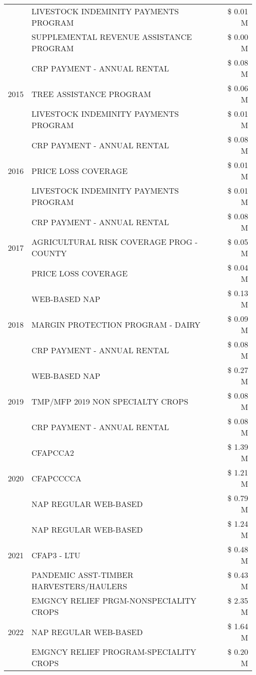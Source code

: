 \begin{tabular}{llr}
 & LIVESTOCK INDEMINITY PAYMENTS PROGRAM & \$ 0.01 M \\
 & SUPPLEMENTAL REVENUE ASSISTANCE PROGRAM & \$ 0.00 M \\
\cline{1-3}
\multirow[t]{3}{*}{2015} & CRP PAYMENT - ANNUAL RENTAL & \$ 0.08 M \\
 & TREE ASSISTANCE PROGRAM & \$ 0.06 M \\
 & LIVESTOCK INDEMINITY PAYMENTS PROGRAM & \$ 0.01 M \\
\cline{1-3}
\multirow[t]{3}{*}{2016} & CRP PAYMENT - ANNUAL RENTAL & \$ 0.08 M \\
 & PRICE LOSS COVERAGE & \$ 0.01 M \\
 & LIVESTOCK INDEMINITY PAYMENTS PROGRAM & \$ 0.01 M \\
\cline{1-3}
\multirow[t]{3}{*}{2017} & CRP PAYMENT - ANNUAL RENTAL & \$ 0.08 M \\
 & AGRICULTURAL RISK COVERAGE PROG - COUNTY & \$ 0.05 M \\
 & PRICE LOSS COVERAGE & \$ 0.04 M \\
\cline{1-3}
\multirow[t]{3}{*}{2018} & WEB-BASED NAP & \$ 0.13 M \\
 & MARGIN PROTECTION PROGRAM - DAIRY & \$ 0.09 M \\
 & CRP PAYMENT - ANNUAL RENTAL & \$ 0.08 M \\
\cline{1-3}
\multirow[t]{3}{*}{2019} & WEB-BASED NAP & \$ 0.27 M \\
 & TMP/MFP 2019 NON SPECIALTY CROPS & \$ 0.08 M \\
 & CRP PAYMENT - ANNUAL RENTAL & \$ 0.08 M \\
\cline{1-3}
\multirow[t]{3}{*}{2020} & CFAPCCA2 & \$ 1.39 M \\
 & CFAPCCCCA & \$ 1.21 M \\
 & NAP REGULAR WEB-BASED & \$ 0.79 M \\
\cline{1-3}
\multirow[t]{3}{*}{2021} & NAP REGULAR WEB-BASED & \$ 1.24 M \\
 & CFAP3 - LTU & \$ 0.48 M \\
 & PANDEMIC ASST-TIMBER HARVESTERS/HAULERS & \$ 0.43 M \\
\cline{1-3}
\multirow[t]{3}{*}{2022} & EMGNCY RELIEF PRGM-NONSPECIALITY CROPS & \$ 2.35 M \\
 & NAP REGULAR WEB-BASED & \$ 1.64 M \\
 & EMGNCY RELIEF PROGRAM-SPECIALITY CROPS & \$ 0.20 M \\
\cline{1-3}
\bottomrule
\end{tabular}
